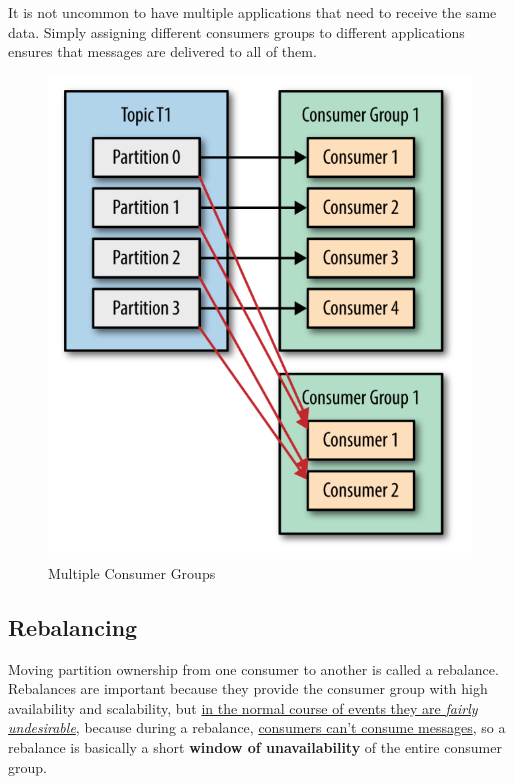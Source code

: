 \begin{paracol}{2}
   It is not uncommon to have multiple applications that need to receive the same data.
   Simply assigning different consumers groups to different applications ensures that messages are delivered to all of them.
   \switchcolumn
   \begin{figure}[htbp]
      \centering
      \includegraphics{images/16/groups.png}
      \caption{Multiple Consumer Groups}
      \label{fig:16/groups}
   \end{figure}
\end{paracol}


\subsection{Rebalancing}

Moving partition ownership from one consumer to another is called a rebalance. Rebalances are important because they provide the consumer group with high availability and scalability,
but \ul{in the normal course of events they are \textit{fairly undesirable}}, because during a rebalance, \ul{consumers can’t consume messages}, so a rebalance is basically a short \textbf{window of unavailability} of the entire consumer group.

